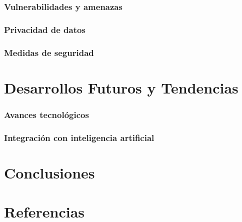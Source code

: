 \documentclass[12pt]{article}
\begin{document}
  \subsubsection*{Vulnerabilidades y amenazas}


  \subsubsection*{Privacidad de datos}


  \subsubsection*{Medidas de seguridad}


  \section*{Desarrollos Futuros y Tendencias}
  \subsubsection*{Avances tecnológicos}


  \subsubsection*{Integración con inteligencia artificial}


  \section*{Conclusiones}

  
  \section*{Referencias}
 
\end{document}
